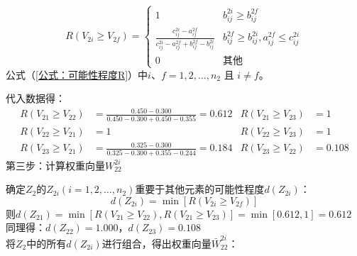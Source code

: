 \documentclass[withoutpreface,bwprint]{cumcmthesis}
\begin{document}
\begin{enumerate}
                      \begin{equation}
                        R(V_{2i} \geq V_{2f})=
                        \left\{
                            \begin{array}{cc}
                            1 & b_{ij}^{2i} \geq b_{ij}^{2f} \\
                            \frac{c_{ij}^{2i} - a_{ij}^{2f}}{c_{ij}^{2i} - a_{ij}^{2f} + b_{ij}^{2f} - b_{ij}^{2i}} & b_{ij}^{2f} \geq b_{ij}^{2i}, a_{ij}^{2f} \leq c_{ij}^{2i} \\
                            0 & \text{其他}
                            \end{array}\right.
                        \label {公式：可能性程度R}
                      \end{equation}
                      \phantom{第二步：}公式（\ref{公式：可能性程度R}）中$i\text{、}f = 1, 2, \dots, n_2$ 且 $i \neq f$。 \par
                      \phantom{第二步：}代入数据得：
                      \begin{align*}
                          R(V_{21} \geq V_{22}) &= \frac{0.450 - 0.300}{0.450 - 0.300 + 0.450 - 0.355} = 0.612 & R(V_{21} \geq V_{23}) &= 1\\
                          R(V_{22} \geq V_{21}) &= 1 & R(V_{22} \geq V_{23}) &= 1\\ 
                          R(V_{23} \geq V_{21}) &= \frac{0.325 - 0.300}{0.325 - 0.300 + 0.355 - 0.244} = 0.184 & R(V_{23} \geq V_{22}) &= 0.108 
                      \end{align*}
                      第三步：计算权重向量$W_{22}^{2i}$ \par
                      \phantom{第三步：}确定$Z_2$的$Z_{2i}(i = 1, 2, \dots, n_2)$重要于其他元素的可能性程度$d(Z_{2i})$：
                      \begin{equation}
                          d(Z_{2i}) = \min[R(V_{2i} \geq V_{2f})]
                          \label {公式：可能性程度d(Z)}
                      \end{equation}
                      \phantom{第三步：}则$d(Z_{21}) = \min[R(V_{21} \geq V_{22}), R(V_{21} \geq V_{23})] = \min[0.612, 1] = 0.612$ \\
                      \phantom{第三步：}同理得：$d(Z_{22}) = 1.000$，$d(Z_{23}) = 0.108$ \\
                      \phantom{第三步：}将$Z_2$中的所有$d(Z_{2i})$进行组合，得出权重向量$\bar{W}_{22}^{2i}$：
                      \begin{equation}

\end{equation}
\end{enumerate}
\end{document}
